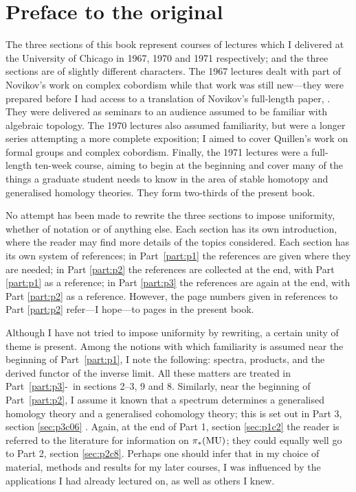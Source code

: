 \documentclass[main]{subfiles}
\begin{document}
\chapter*{Preface to the original}
The three sections of this book represent courses of lectures which I delivered at the University of Chicago in 1967, 1970 and 1971 respectively; and the three sections are of slightly different characters.
The 1967 lectures dealt with part of Novikov's work on complex cobordism while that work was still new---they were prepared before I had access to a translation of Novikov's full-length paper, \cite{novikov3}. 
They were delivered as seminars to an audience assumed to be familiar with algebraic topology. 
The 1970 lectures also assumed familiarity, but were a longer series attempting a more complete exposition; I aimed to cover Quillen's work on formal groups and complex cobordism.
Finally, the 1971 lectures were a full-length ten-week course, aiming to begin at the beginning and cover many of the things a graduate student needs to know in the area of stable homotopy and generalised homology theories.
They form two-thirds of the present book.

No attempt has been made to rewrite the three sections to impose uniformity, whether of notation or of anything else. 
Each section has its own introduction, where the reader may find more details of the topics considered. 
Each section has its own system of references; in Part~\ref{part:p1} the
references are given where they are needed; in Part \ref{part:p2} the references are collected at the end, with Part \ref{part:p1} as a reference; in Part \ref{part:p3} the references are again at the end, with Part \ref{part:p2} as a reference.
However, the page numbers given in references to Part \ref{part:p2} refer---I hope---to pages in the present book.

Although I have not tried to impose uniformity by rewriting, a certain unity of theme is present. 
Among the notions with which familiarity is assumed near the beginning of Part~\ref{part:p1}, I note the following: spectra, products, and the derived functor of the inverse limit. 
All these matters are treated in Part~\ref{part:p3}-~in sections 2--3, 9 and 8. Similarly, near the beginning of Part~\ref{part:p2}, I assume it known that a spectrum determines a generalised homology theory and a generalised cohomology theory; this is set out in Part 3, section \ref{sec:p3c06} . 
Again, at the end of Part 1, section \ref{sec:p1c2} the reader is referred to the literature for information on $\pi_{*} (\mathrm{MU})$; they could equally well go to Part 2, section \ref{sec:p2c8}. Perhaps one should infer that in my choice of material, methods and results for my later courses, I was influenced by the applications I had already lectured on, as well as others I knew.
\end{document}
